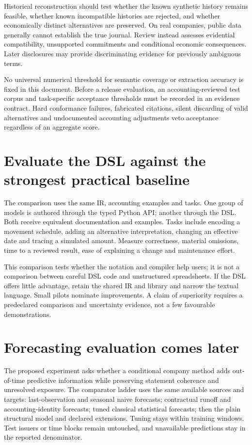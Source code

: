 Historical reconstruction should test whether the known synthetic history
remains feasible, whether known incompatible histories are rejected, and
whether economically distinct alternatives are preserved. On real companies,
public data generally cannot establish the true journal. Review instead
assesses evidential compatibility, unsupported commitments and conditional
economic consequences. Later disclosures may provide discriminating evidence
for previously ambiguous terms.

No universal numerical threshold for semantic coverage or extraction accuracy
is fixed in this document. Before a release evaluation, an accounting-reviewed
test corpus and task-specific acceptance thresholds must be recorded in an
evidence contract. Hard conformance failures, fabricated citations, silent
discarding of valid alternatives and undocumented accounting adjustments veto
acceptance regardless of an aggregate score.

\section{Evaluate the DSL against the strongest practical baseline}

The comparison uses the same IR, accounting examples and tasks. One group of
models is authored through the typed Python API; another through the DSL.
Both receive equivalent documentation and examples. Tasks include encoding a
movement schedule, adding an alternative interpretation, changing an effective
date and tracing a simulated amount. Measure correctness, material omissions,
time to a reviewed result, ease of explaining a change and maintenance effort.

This comparison tests whether the notation and compiler help users; it is not
a comparison between careful DSL code and unstructured spreadsheets. If the
DSL offers little advantage, retain the shared IR and library and narrow the
textual language. Small pilots nominate improvements. A claim of superiority
requires a predeclared comparison and uncertainty evidence, not a few favourable
demonstrations.

\section{Forecasting evaluation comes later}

The proposed experiment asks whether a conditional company method adds
out-of-time predictive information while preserving statement coherence and
unresolved exposure. The comparator ladder uses the same available sources and
targets: last-observation and seasonal naive forecasts; contractual runoff and
accounting-identity forecasts; tuned classical statistical forecasts; then the
plain structural model and declared extensions. Tuning stays within training
windows. Test issuers or time blocks remain untouched, and unavailable
predictions stay in the reported denominator.

